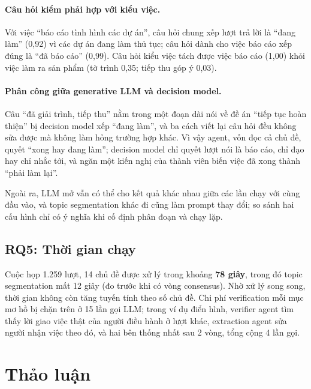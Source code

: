 \documentclass[11pt]{article}
\begin{document}
\paragraph{Câu hỏi kiểm phải hợp với kiểu việc.} Với việc ``báo cáo tình hình các dự án'', câu hỏi chung
xếp lượt trả lời là ``đang làm'' (0,92) vì các dự án đang làm thủ tục; câu hỏi dành cho việc báo cáo xếp
đúng là ``đã báo cáo'' (0,99). Câu hỏi kiểu việc tách được việc báo cáo (1,00) khỏi việc làm ra sản
phẩm (tờ trình 0,35; tiếp thu góp ý 0,03).

\paragraph{Phân công giữa generative LLM và decision model.} Câu ``đã giải trình, tiếp thu'' nằm trong một đoạn dài
nói về đề án ``tiếp tục hoàn thiện'' bị decision model xếp ``đang làm'', và ba cách viết lại câu hỏi đều
không sửa được mà không làm hỏng trường hợp khác. Vì vậy agent, vốn đọc cả chủ đề, quyết ``xong hay đang
làm''; decision model chỉ quyết lượt nói là báo cáo, chỉ đạo hay chỉ nhắc tới, và ngăn một kiến nghị của
thành viên biến việc đã xong thành ``phải làm lại''.

Ngoài ra, LLM mở vẫn có thể cho kết quả khác nhau giữa các lần chạy với cùng đầu vào, và topic segmentation khác
đi cũng làm prompt thay đổi; so sánh hai cấu hình chỉ có ý nghĩa khi cố định phân đoạn và chạy lặp.

\subsection{RQ5: Thời gian chạy}

Cuộc họp 1.259 lượt, 14 chủ đề được xử lý trong khoảng \textbf{78 giây}, trong đó topic segmentation mất 12 giây
(đo trước khi có vòng consensus). Nhờ xử lý song song, thời gian không còn tăng tuyến tính theo số chủ
đề. Chi phí verification mỗi mục mơ hồ bị chặn trên ở 15 lần gọi LLM; trong ví dụ điển hình, verifier agent tìm thấy lời giao việc thật của người điều hành ở lượt khác, extraction agent sửa người nhận việc
theo đó, và hai bên thống nhất sau 2 vòng, tổng cộng 4 lần gọi.

\section{Thảo luận}
\end{document}
